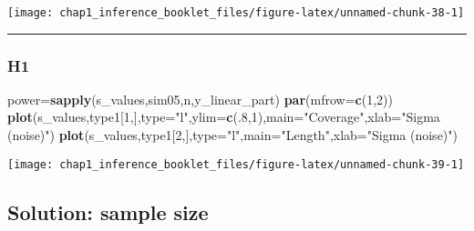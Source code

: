 \documentclass[]{article}
\newenvironment{Shaded}{\begin{snugshade}}{\end{snugshade}}
\newcommand{\KeywordTok}[1]{\textcolor[rgb]{0.13,0.29,0.53}{\textbf{#1}}}
\newcommand{\DataTypeTok}[1]{\textcolor[rgb]{0.13,0.29,0.53}{#1}}
\newcommand{\DecValTok}[1]{\textcolor[rgb]{0.00,0.00,0.81}{#1}}
\newcommand{\StringTok}[1]{\textcolor[rgb]{0.31,0.60,0.02}{#1}}
\newcommand{\NormalTok}[1]{#1}
\begin{document}
\begin{center}\texttt{[image: chap1\_inference\_booklet\_files/figure-latex/unnamed-chunk-38-1]} \end{center}

\begin{center}\rule{0.5\linewidth}{\linethickness}\end{center}

\subsubsection{H1}\label{h1-1}

\begin{Shaded}
\begin{Highlighting}[]
\NormalTok{power=}\KeywordTok{sapply}\NormalTok{(s_values,sim05,n,y_linear_part)}
\KeywordTok{par}\NormalTok{(}\DataTypeTok{mfrow=}\KeywordTok{c}\NormalTok{(}\DecValTok{1}\NormalTok{,}\DecValTok{2}\NormalTok{))}
\KeywordTok{plot}\NormalTok{(s_values,type1[}\DecValTok{1}\NormalTok{,],}\DataTypeTok{type=}\StringTok{"l"}\NormalTok{,}\DataTypeTok{ylim=}\KeywordTok{c}\NormalTok{(.}\DecValTok{8}\NormalTok{,}\DecValTok{1}\NormalTok{),}\DataTypeTok{main=}\StringTok{"Coverage"}\NormalTok{,}\DataTypeTok{xlab=}\StringTok{"Sigma (noise)"}\NormalTok{)}
\KeywordTok{plot}\NormalTok{(s_values,type1[}\DecValTok{2}\NormalTok{,],}\DataTypeTok{type=}\StringTok{"l"}\NormalTok{,}\DataTypeTok{main=}\StringTok{"Length"}\NormalTok{,}\DataTypeTok{xlab=}\StringTok{"Sigma (noise)"}\NormalTok{)}
\end{Highlighting}
\end{Shaded}

\begin{center}\texttt{[image: chap1\_inference\_booklet\_files/figure-latex/unnamed-chunk-39-1]} \end{center}

\subsection{Solution: sample size}\label{solution-sample-size}
\end{document}
